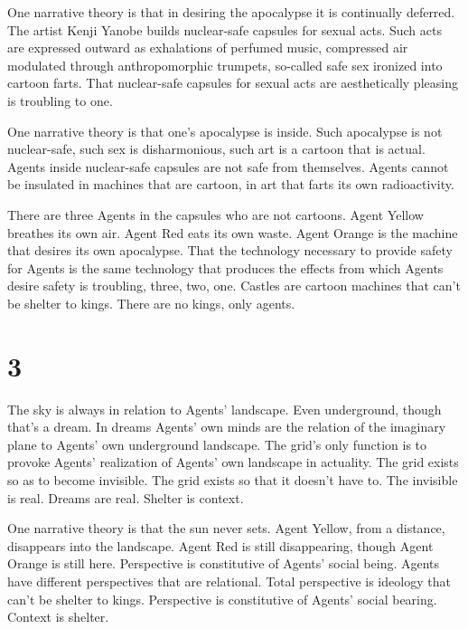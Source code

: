 \documentclass[
]{memoir}
\begin{document}
One narrative theory is that in desiring the apocalypse it is
continually deferred. The artist Kenji Yanobe builds nuclear-safe
capsules for sexual acts. Such acts are expressed outward as exhalations
of perfumed music, compressed air modulated through anthropomorphic
trumpets, so-called safe sex ironized into cartoon farts. That
nuclear-safe capsules for sexual acts are aesthetically pleasing is
troubling to one.

One narrative theory is that one's apocalypse is inside. Such apocalypse
is not nuclear-safe, such sex is disharmonious, such art is a cartoon
that is actual. Agents inside nuclear-safe capsules are not safe from
themselves. Agents cannot be insulated in machines that are cartoon, in
art that farts its own radioactivity.

There are three Agents in the capsules who are not cartoons. Agent
Yellow breathes its own air. Agent Red eats its own waste. Agent Orange
is the machine that desires its own apocalypse. That the technology
necessary to provide safety for Agents is the same technology that
produces the effects from which Agents desire safety is troubling,
three, two, one. Castles are cartoon machines that can't be shelter to
kings. There are no kings, only agents.

\hypertarget{section-4}{%
\section*{3}\label{section-4}}

The sky is always in relation to Agents' landscape. Even underground,
though that's a dream. In dreams Agents' own minds are the relation of
the imaginary plane to Agents' own underground landscape. The grid's
only function is to provoke Agents' realization of Agents' own landscape
in actuality. The grid exists so as to become invisible. The grid exists
so that it doesn't have to. The invisible is real. Dreams are real.
Shelter is context.

One narrative theory is that the sun never sets. Agent Yellow, from a
distance, disappears into the landscape. Agent Red is still
disappearing, though Agent Orange is still here. Perspective is
constitutive of Agents' social being. Agents have different perspectives
that are relational. Total perspective is ideology that can't be shelter
to kings. Perspective is constitutive of Agents' social bearing. Context
is shelter.
\end{document}

